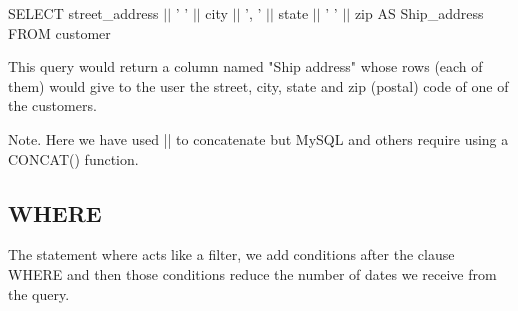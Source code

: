 \documentclass[10pt, oneside]{article}
\begin{document}
\begin{itemize}
    \begin{center}
    	SELECT street\_address $\vert$$\vert$ ' ' $\vert$$\vert$ city $\vert$$\vert$ ', ' $\vert$$\vert$ state $\vert$$\vert$ ' ' $\vert$$\vert$ zip AS Ship\_address FROM customer
    \end{center}
    
    This query would return a column named "Ship address" whose rows (each of them) would give to the user the street, city, state and zip (postal) code of one of the customers.
    
    \color{blue}Note. \color{black}Here we have used || to concatenate but MySQL and others require using a CONCAT() function.
	
\end{itemize}

\subsection{WHERE}

The statement where acts like a filter, we add conditions after the clause WHERE and then those conditions reduce the number of dates we receive from the query.
\end{document}
